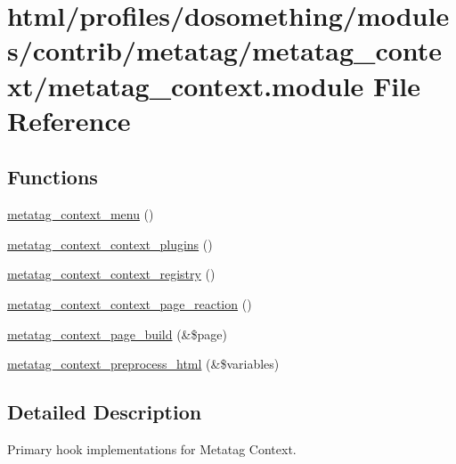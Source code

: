 \hypertarget{metatag__context_8module}{
\section{html/profiles/dosomething/modules/contrib/metatag/metatag\_\-context/metatag\_\-context.module File Reference}
\label{metatag__context_8module}
}
\subsection*{Functions}
\begin{DoxyCompactItemize}
\item 
\hyperlink{metatag__context_8module_a23526ae514a5ac48cb005f3953b5198e}{metatag\_\-context\_\-menu} ()
\item 
\hyperlink{metatag__context_8module_aa53671bcb635af29bfaf36cdce7edf4c}{metatag\_\-context\_\-context\_\-plugins} ()
\item 
\hyperlink{metatag__context_8module_a9dd3421d6c4fe430b6f78b950c6f96c2}{metatag\_\-context\_\-context\_\-registry} ()
\item 
\hyperlink{metatag__context_8module_a9ede48fb9ef97f03d08949ef437ffc88}{metatag\_\-context\_\-context\_\-page\_\-reaction} ()
\item 
\hyperlink{metatag__context_8module_ae9aec377175590dfb274950b2efcca59}{metatag\_\-context\_\-page\_\-build} (\&\$page)
\item 
\hyperlink{metatag__context_8module_a4cd862515789578ba6c88c8df512f0d6}{metatag\_\-context\_\-preprocess\_\-html} (\&\$variables)
\end{DoxyCompactItemize}


\subsection{Detailed Description}
Primary hook implementations for Metatag Context. 

